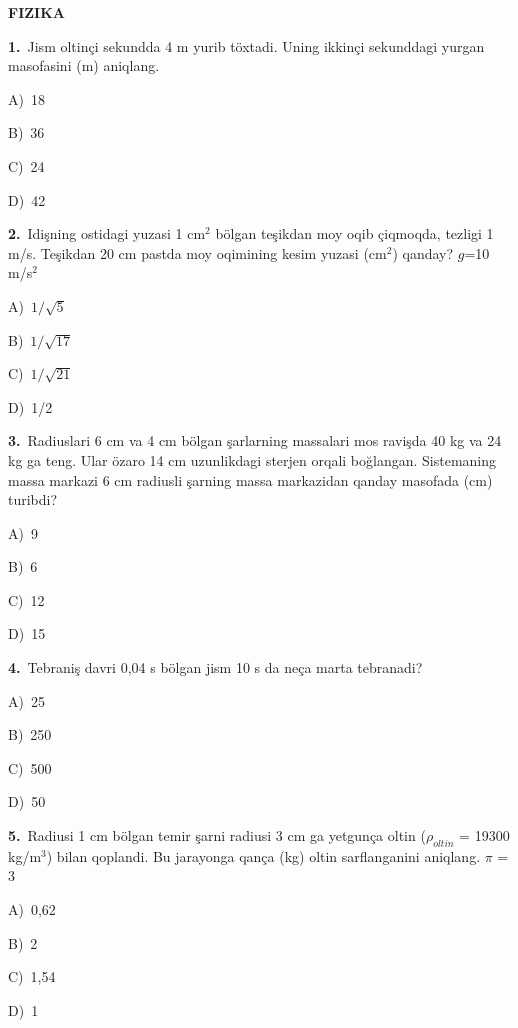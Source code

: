 \documentclass[11pt,a4paper]{article}
\newcommand{\opt}[2]{\hspace*{4mm}#1)\ #2\par}
\begin{document}
\begin{center}{\Large\textbf{FIZIKA}}\end{center}
\noindent\begin{minipage}{\linewidth}
\textbf{1.}\ Jism oltinçi sekundda 4 m yurib töxtadi. Uning ikkinçi sekunddagi yurgan masofasini (m) aniqlang.\par\smallskip
\opt{A}{18}
\opt{B}{36}
\opt{C}{24}
\opt{D}{42}
\end{minipage}\vspace{9pt}\par
\noindent\begin{minipage}{\linewidth}
\textbf{2.}\ Idişning ostidagi yuzasi 1 cm$^{2}$ bölgan teşikdan moy oqib çiqmoqda, tezligi 1 m/s. Teşikdan 20 cm pastda moy oqimining kesim yuzasi (cm$^{2}$) qanday? $g$=10 m/s$^{2}$\par\smallskip
\opt{A}{$1/\sqrt{5}$}
\opt{B}{$1/\sqrt{17}$}
\opt{C}{$1/\sqrt{21}$}
\opt{D}{1/2}
\end{minipage}\vspace{9pt}\par
\noindent\begin{minipage}{\linewidth}
\textbf{3.}\ Radiuslari 6 cm va 4 cm bölgan şarlarning massalari mos ravişda 40 kg va 24 kg ga teng. Ular özaro 14 cm uzunlikdagi sterjen orqali boğlangan. Sistemaning massa markazi 6 cm radiusli şarning massa markazidan qanday masofada (cm) turibdi?\par\smallskip
\opt{A}{9}
\opt{B}{6}
\opt{C}{12}
\opt{D}{15}
\end{minipage}\vspace{9pt}\par
\noindent\begin{minipage}{\linewidth}
\textbf{4.}\ Tebraniş davri 0,04 s bölgan jism 10 s da neça marta tebranadi?\par\smallskip
\opt{A}{25}
\opt{B}{250}
\opt{C}{500}
\opt{D}{50}
\end{minipage}\vspace{9pt}\par
\noindent\begin{minipage}{\linewidth}
\textbf{5.}\ Radiusi 1 cm bölgan temir şarni radiusi 3 cm ga yetgunça oltin ($\rho_{oltin}$ = 19300 kg/m$^{3}$) bilan qoplandi. Bu jarayonga qança (kg) oltin sarflanganini aniqlang. $\pi$ = 3\par\smallskip
\opt{A}{0,62}
\opt{B}{2}
\opt{C}{1,54}
\opt{D}{1}
\end{minipage}\vspace{9pt}\par
\end{document}
